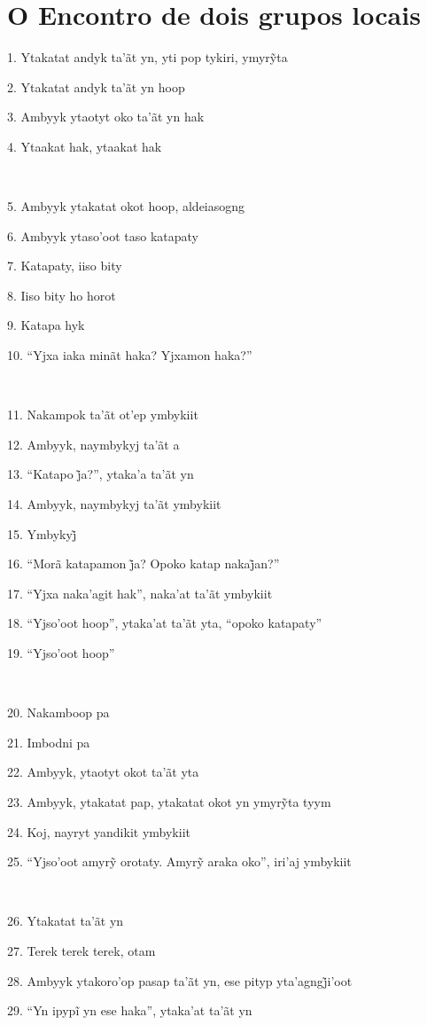 \chapter*{O Encontro de dois grupos locais}

1. Ytakatat andyk ta’ãt yn, yti pop tykiri, ymyrỹta

2. Ytakatat andyk ta'ãt yn hoop

3. Ambyyk ytaotyt oko ta'ãt yn hak

4. Ytaakat hak, ytaakat hak

~

5. Ambyyk ytakatat okot hoop, aldeiasogng

6. Ambyyk ytaso'oot taso katapaty

7. Katapaty, iiso bity

8. Iiso bity ho horot

9. Katapa hyk

10. ``Yjxa iaka minãt haka? Yjxamon haka?''

~

11. Nakampok ta'ãt ot'ep ymbykiit

12. Ambyyk, naymbykyj ta'ãt a

13. ``Katapo j̃a?'', ytaka’a ta’ãt yn

14. Ambyyk, naymbykyj ta'ãt ymbykiit

15. Ymbykyj̃

16. ``Morã katapamon j̃a? Opoko katap nakaj̃an?''

17. ``Yjxa naka'agit hak'', naka'at ta'ãt ymbykiit

18. ``Yjso'oot hoop'', ytaka'at ta'ãt yta, ``opoko katapaty''

19. ``Yjso'oot hoop''

~

20. Nakamboop pa

21. Imbodni pa

22. Ambyyk, ytaotyt okot ta'ãt yta

23. Ambyyk, ytakatat pap, ytakatat okot yn ymyrỹta tyym

24. Koj, nayryt yandikit ymbykiit

25. ``Yjso’oot amyrỹ orotaty. Amyrỹ araka oko'', iri’aj ymbykiit

~

26. Ytakatat ta'ãt yn

27. Terek terek terek, otam

28. Ambyyk ytakoro’op pasap ta’ãt yn, ese pityp yta’agngj̃i’oot

29. ``Yn ipypĩ yn ese haka'', ytaka’at ta’ãt yn

